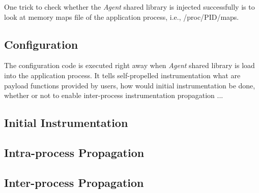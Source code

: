 One trick to check whether the {\em Agent} shared library is injected
successfully is to look at memory maps file of the application process, i.e.,
/proc/PID/maps.

\subsection{Configuration}
The configuration code is executed right away when {\em Agent} shared library is
load into the application process.
It tells self-propelled instrumentation what are payload functions provided by
users, how would initial instrumentation be done, whether or not to enable
inter-process instrumentation propagation ...

\subsection{Initial Instrumentation}

\subsection{Intra-process Propagation}

\subsection{Inter-process Propagation}
